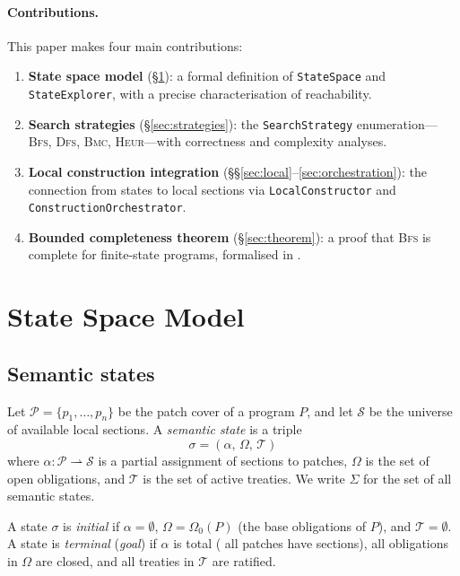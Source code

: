 \documentclass[11pt]{article}
\newcommand{\St}{\Sigma}                      %
\newcommand{\state}{\sigma}                   %
\newcommand{\BFS}{\textsc{Bfs}}
\newcommand{\DFS}{\textsc{Dfs}}
\newcommand{\BMC}{\textsc{Bmc}}
\newcommand{\HEUR}{\textsc{Heur}}
\newcommand{\patchset}{\mathcal{P}}           %
\begin{document}
\paragraph{Contributions.}
This paper makes four main contributions:
\begin{enumerate}
  \item \textbf{State space model} (\S\ref{sec:statespace}): a formal
    definition of \texttt{StateSpace} and \texttt{StateExplorer}, with
    a precise characterisation of reachability.
  \item \textbf{Search strategies} (\S\ref{sec:strategies}): the
    \texttt{SearchStrategy} enumeration---\BFS{}, \DFS{}, \BMC{},
    \HEUR{}---with correctness and complexity analyses.
  \item \textbf{Local construction integration}
    (\S\S\ref{sec:local}--\ref{sec:orchestration}): the connection from
    states to local sections via \texttt{LocalConstructor} and
    \texttt{ConstructionOrchestrator}.
  \item \textbf{Bounded completeness theorem}
    (\S\ref{sec:theorem}): a proof that \BFS{} is complete for
    finite-state programs, formalised in \LEAN{}.
\end{enumerate}

\section{State Space Model}\label{sec:statespace}

\subsection{Semantic states}

\begin{definition}\label{def:state}
Let $\patchset = \{p_1, \dots, p_n\}$ be the patch cover of a program
$P$, and let $\mathcal{S}$ be the universe of available local sections.
A \emph{semantic state} is a triple
\[
  \state = (\alpha,\, \Omega,\, \mathcal{T})
\]
where $\alpha\colon \patchset \rightharpoonup \mathcal{S}$ is a partial
assignment of sections to patches, $\Omega$ is the set of open
obligations, and $\mathcal{T}$ is the set of active treaties.  We write
$\St$ for the set of all semantic states.
\end{definition}

A state $\state$ is \emph{initial} if $\alpha = \emptyset$,
$\Omega = \Omega_0(P)$ (the base obligations of $P$), and
$\mathcal{T} = \emptyset$.  A state is \emph{terminal} (\emph{goal})
if $\alpha$ is total (\ie{} all patches have sections), all
obligations in $\Omega$ are closed, and all treaties in $\mathcal{T}$
are ratified.
\end{document}
